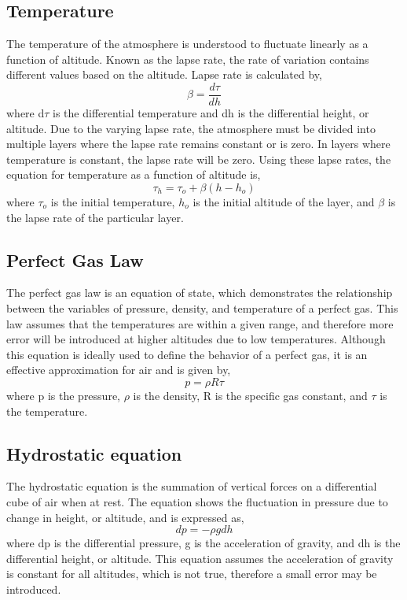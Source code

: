 \documentclass[12pt]{report}
\begin{document}
\subsection{Temperature}
The temperature of the atmosphere is understood to fluctuate linearly as a function of altitude. Known as the lapse rate, the rate of variation contains different values based on the altitude. Lapse rate is calculated by,
\begin{equation}
	\beta = \frac{d\tau}{dh}
	\label{equation:beta}
\end{equation}
where d\(\tau\) is the differential temperature and dh is the differential height, or altitude. Due to the varying lapse rate, the atmosphere must be divided into multiple layers where the lapse rate remains constant or is zero. In layers where temperature is constant, the lapse rate will be zero. Using these lapse rates, the equation for temperature as a function of altitude is,
\begin{equation}
	\tau_{h} = \tau_{o} + \beta(h - h_{o})
	\label{equation:tauh}
\end{equation}
where \(\tau_{o}\) is the initial temperature, \(h_{o}\) is the initial altitude of the layer, and \(\beta\) is the lapse rate of the particular layer.

\subsection{Perfect Gas Law}
The perfect gas law is an equation of state, which demonstrates the relationship between the variables of pressure, density, and temperature of a perfect gas. This law assumes that the temperatures are within a given range, and therefore more error will be introduced at higher altitudes due to low temperatures. Although this equation is ideally used to define the behavior of a perfect gas, it is an effective approximation for air and is given by,
\begin{equation}
	p = \rho R \tau
	\label{equation:pressure}
\end{equation}
where p is the pressure, \(\rho\) is the density, R is the specific gas constant, and \(\tau\) is the temperature.

\subsection{Hydrostatic equation}
The hydrostatic equation is the summation of vertical forces on a differential cube of air when at rest. The equation shows the fluctuation in pressure due to change in height, or altitude, and is expressed as,
\begin{equation}
	dp = -\rho gdh
	\label{equation:dpressure}
\end{equation}
where dp is the differential pressure, g is the acceleration of gravity, and dh is the differential height, or altitude. This equation assumes the acceleration of gravity is constant for all altitudes, which is not true, therefore a small error may be introduced. 
\end{document}

